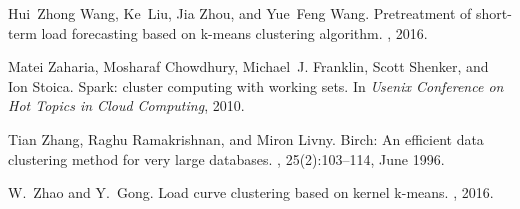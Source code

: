 \documentclass[runningheads]{llncs}
\begin{document}
\begin{thebibliography}{8}
Hui~Zhong Wang, Ke~Liu, Jia Zhou, and Yue~Feng Wang.
\newblock Pretreatment of short-term load forecasting based on k-means
clustering algorithm.
, 2016.

Matei Zaharia, Mosharaf Chowdhury, Michael~J. Franklin, Scott Shenker, and Ion
Stoica.
\newblock Spark: cluster computing with working sets.
\newblock In {\em Usenix Conference on Hot Topics in Cloud Computing}, 2010.

Tian Zhang, Raghu Ramakrishnan, and Miron Livny.
\newblock Birch: An efficient data clustering method for very large databases.
, 25(2):103--114, June 1996.

W.~Zhao and Y.~Gong.
\newblock Load curve clustering based on kernel k-means.
, 2016.
\end{thebibliography}
\end{document}

